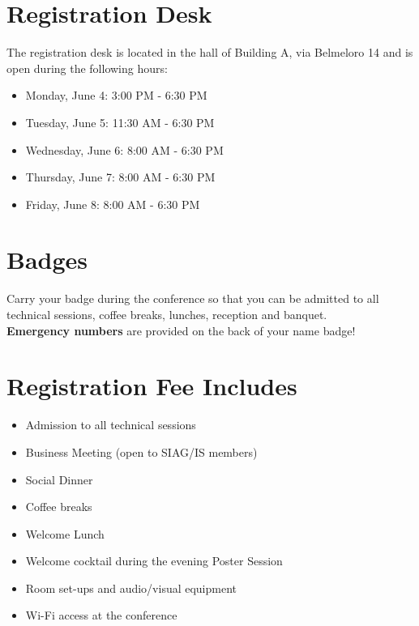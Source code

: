 \newpage
\section*{Registration Desk}
The registration desk is located in the hall of Building A, via Belmeloro 14 and is open during the following hours:
\bigskip

\begin{itemize}
  \item[] Monday, June 4: 3:00 PM - 6:30 PM
  \item[] Tuesday, June 5: 11:30 AM - 6:30 PM
  \item[] Wednesday, June 6: 8:00 AM - 6:30 PM
  \item[] Thursday, June 7: 8:00 AM - 6:30 PM
  \item[] Friday, June 8: 8:00 AM - 6:30 PM
\end{itemize}

\section*{Badges} Carry your badge during the conference so that you can be admitted to all technical sessions, coffee breaks, lunches, reception and banquet.\\
\textbf{Emergency numbers} are provided on the back of your name badge! 
\section*{Registration Fee Includes}
\begin{itemize}
  \item[] Admission to all technical sessions
  \item[] Business Meeting (open to SIAG/IS members)
  \item[] Social Dinner
  \item[] Coffee breaks 
  \item[] Welcome Lunch 
  \item[] Welcome cocktail during the evening Poster Session
  \item[] Room set-ups and audio/visual equipment
  \item[] Wi-Fi access at the conference
\end{itemize}%
